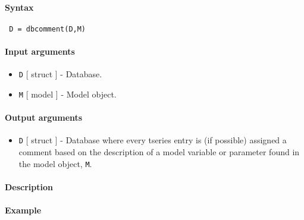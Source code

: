 


	\paragraph{Syntax}

\begin{verbatim}
 D = dbcomment(D,M)
\end{verbatim}

\paragraph{Input arguments}

\begin{itemize}
\item
  \texttt{D} {[} struct {]} - Database.
\item
  \texttt{M} {[} model {]} - Model object.
\end{itemize}

\paragraph{Output arguments}

\begin{itemize}
\itemsep1pt\parskip0pt
\item
  \texttt{D} {[} struct {]} - Database where every tseries entry is (if
  possible) assigned a comment based on the description of a model
  variable or parameter found in the model object, \texttt{M}.
\end{itemize}

\paragraph{Description}

\paragraph{Example}


